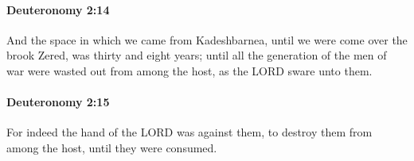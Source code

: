 		\paragraph{Deuteronomy 2:14} %
			\label{DEUTERONOMY-2-14}

			And the space in which we came from Kadeshbarnea, until we were come over the brook Zered, was thirty and eight years; until all the generation of the men of war were wasted out from among the host, as the LORD sware unto them.


		\paragraph{Deuteronomy 2:15} %
			\label{DEUTERONOMY-2-15}

			For indeed the hand of the LORD was against them, to destroy them from among the host, until they were consumed.



